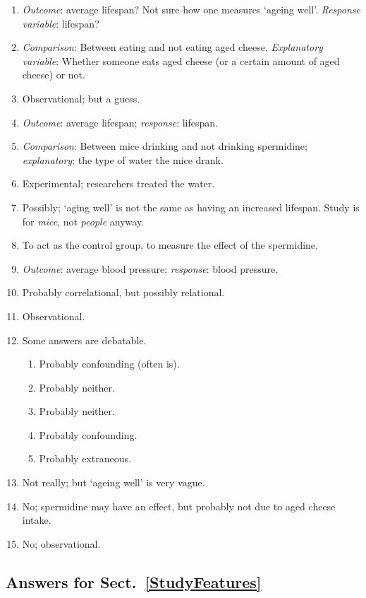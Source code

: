 \documentclass[
  11pt,
  a4paper,
  krantz2]{krantz}
\providecommand{\tightlist}{%
  \setlength{\itemsep}{0pt}\setlength{\parskip}{0pt}}
\begin{document}
\begin{footnotesize}
\begin{enumerate}
\def\labelenumi{\arabic{enumi}.}
\tightlist
\item
  \emph{Outcome}: average lifespan? Not sure how one measures `ageing well'. \tightlist
  \emph{Response variable}: lifespan?
\item
  \emph{Comparison}: Between eating and not eating aged cheese.
  \emph{Explanatory variable}: Whether someone eats aged cheese (or a certain amount of aged cheese) or not.
\item
  Observational; but a guess.
\item
  \emph{Outcome}: average lifespan; \emph{response}: lifespan.
\item
  \emph{Comparison}: Between mice drinking and not drinking spermidine; \emph{explanatory}: the type of water the mice drank.
\item
  Experimental; researchers treated the water.
\item
  Possibly; `aging well' is not the same as having an increased lifespan.
  Study is for \emph{mice}, not \emph{people} anyway.
\item
  To act as the control group, to measure the effect of the spermidine.
\item
  \emph{Outcome}: average blood pressure; \emph{response}: blood pressure.
\item
  Probably correlational, but possibly relational.
\item
  Observational.
\item
  Some answers are debatable.

  \begin{enumerate}
  \def\labelenumii{\alph{enumii}.}
  \tightlist
  \item
    Probably confounding (often is).
  \item
    Probably neither.
  \item
    Probably neither.
  \item
    Probably confounding.
  \item
    Probably extraneous.
  \end{enumerate}
\item
  Not really; but `ageing well' is very vague.
\item
  No; spermidine may have an effect, but probably not due to aged cheese intake.
\item
  No; observational.
\end{enumerate}

\subsection*{Answers for Sect.~\ref{StudyFeatures}}\label{answers-for-sect.-refstudyfeatures}


\end{footnotesize}
\end{document}

